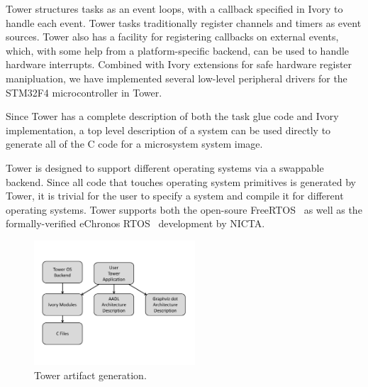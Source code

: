 
Tower structures tasks as an event loops,  with a callback specified in Ivory to
handle each  event. Tower  tasks traditionally register  channels and  timers as
event sources. Tower  also has a facility for registering  callbacks on external
events, which, with  some help from a platform-specific backend,  can be used to
handle hardware  interrupts. Combined  with Ivory  extensions for  safe hardware
register manipluation, we have  implemented several low-level peripheral drivers
for the STM32F4 microcontroller in Tower.  

Since Tower has a complete description of both the task glue code and Ivory
implementation, a top level description of a system can be used directly to
generate all of the C code for a microsystem system image.

Tower is designed to support different operating systems via a swappable
backend. Since all code that touches operating system primitives is generated by
Tower, it is trivial for the user to specify a system and compile it for
different operating systems. Tower supports both the open-soure
FreeRTOS~\cite{freertos} as well as the
formally-verified eChronos
RTOS~\cite{echronos} development
by NICTA.

\begin{figure}[ht!]
  \begin{center}
\includegraphics[width=6cm]{figures/tower-artifacts-dia}
  \end{center}
  \caption[Tower artifacts]{Tower artifact generation.}
\label{fig:towerArtifacts}
\end{figure}

